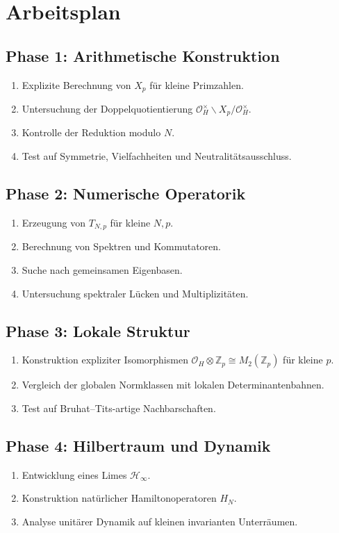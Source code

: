 \documentclass[12pt,a4paper]{article}
\theoremstyle{plain}
\theoremstyle{definition}
\theoremstyle{remark}
\newcommand{\OH}{\mathcal O_H}
\newcommand{\Hinf}{\mathcal H_\infty}
\newcommand{\Zp}{\mathbb Z_p}
\begin{document}
	\section{Arbeitsplan}
	
	\subsection*{Phase 1: Arithmetische Konstruktion}
	\begin{enumerate}
		\item Explizite Berechnung von \(X_p\) für kleine Primzahlen.
		\item Untersuchung der Doppelquotientierung \(\OH^\times\backslash X_p/\OH^\times\).
		\item Kontrolle der Reduktion modulo \(N\).
		\item Test auf Symmetrie, Vielfachheiten und Neutralitätsausschluss.
	\end{enumerate}
	
	\subsection*{Phase 2: Numerische Operatorik}
	\begin{enumerate}
		\item Erzeugung von \(T_{N,p}\) für kleine \(N,p\).
		\item Berechnung von Spektren und Kommutatoren.
		\item Suche nach gemeinsamen Eigenbasen.
		\item Untersuchung spektraler Lücken und Multiplizitäten.
	\end{enumerate}
	
	\subsection*{Phase 3: Lokale Struktur}
	\begin{enumerate}
		\item Konstruktion expliziter Isomorphismen \(\OH\otimes\Zp \cong M_2(\Zp)\) für kleine \(p\).
		\item Vergleich der globalen Normklassen mit lokalen Determinantenbahnen.
		\item Test auf Bruhat--Tits-artige Nachbarschaften.
	\end{enumerate}
	
	\subsection*{Phase 4: Hilbertraum und Dynamik}
	\begin{enumerate}
		\item Entwicklung eines Limes \(\Hinf\).
		\item Konstruktion natürlicher Hamiltonoperatoren \(H_N\).
		\item Analyse unitärer Dynamik auf kleinen invarianten Unterräumen.
	\end{enumerate}
	
\end{document}
